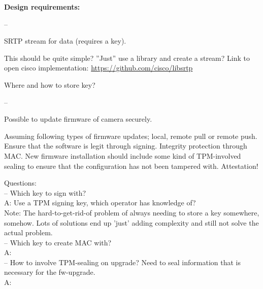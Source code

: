 \documentclass[10pt]{article}
\newenvironment{checklist}{%
  \begin{list}{}{}%
  \let\olditem\item
  \renewcommand\item{\olditem -- \marginpar{$\Box$} }
  \newcommand\checkeditem{\olditem -- \marginpar{$\CheckedBox$} }
}{%
  \end{list}
}
\begin{document}
    \textbf{Design requirements:}
    \begin{checklist}
      \item{
        SRTP stream for data (requires a key).

        This should be quite simple? ''Just'' use a library and create a
        stream? Link to open cisco implementation:
        \url{https://github.com/cisco/libsrtp}

	Where and how to store key?
      }
      \item{
        Possible to update firmware of camera securely.

        Assuming following types of firmware updates; local, remote pull or
        remote push. Ensure that the software is legit through signing.
        Integrity protection through MAC. New firmware installation should
        include some kind of TPM-involved sealing to ensure that the configuration
        has not been tampered with. Attestation!

        Questions: \\
        -- Which key to sign with? \\
        A: Use a TPM signing key, which operator has knowledge of? \\ 
	Note: The hard-to-get-rid-of problem of always needing to store a key somewhere, somehow. Lots of solutions end up 'just' adding complexity 
	and still not solve the actual problem. \\
        -- Which key to create MAC with? \\
        A: \\
        -- How to involve TPM-sealing on upgrade? Need to seal information that
        is necessary for the fw-upgrade.\\
        A: \\

}
\end{checklist}
\end{document}
